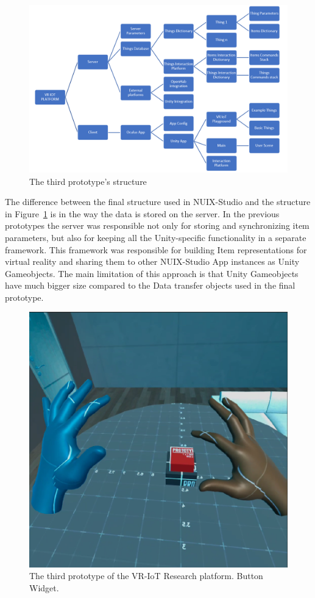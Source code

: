 \begin{figure}
  \centering
  \includegraphics[width=0.9\linewidth]{figures/Prototype3Structure.png}
  \caption{The third prototype's structure}
  \label{fig:Prototype3Structure-figure}
\end{figure}

The difference between the final structure used in NUIX-Studio and the structure in Figure~\ref{fig:Prototype3Structure-figure} is in the way the data is stored on the server. In the previous prototypes the server was responsible not only for storing and synchronizing item parameters, but also for keeping all the Unity-specific functionality in a separate framework. This framework was responsible for building Item representations for virtual reality and sharing them to other NUIX-Studio App instances as Unity Gameobjects. The main limitation of this approach is that Unity Gameobjects have much bigger size compared to the Data transfer objects used in the final prototype.

\begin{figure}
  \centering
  \includegraphics[width=0.6\linewidth]{figures/Prototype3.png}
  \caption{The third prototype of the VR-IoT Research platform. Button Widget.}
  \label{fig:Prototype3-figure}
\end{figure}

